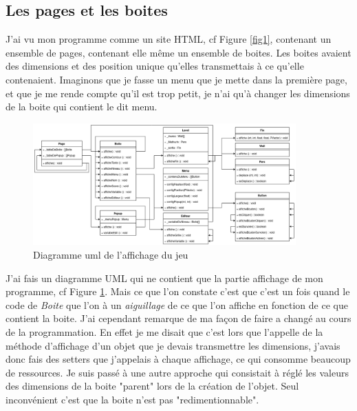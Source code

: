 \documentclass[10pt,a4paper]{article}
\begin{document}
\subsection{Les pages et les boites}
J'ai vu mon programme comme un site HTML, cf Figure \ref{fig1}, contenant un ensemble de pages, contenant elle même un ensemble de boites. Les boites avaient des dimensions et des position unique qu'elles transmettais à ce qu'elle contenaient. Imaginons que je fasse un menu que je mette dans la première page, et que je me rende compte qu'il est trop petit, je n'ai qu'à changer les dimensions de la boite qui contient le dit menu. 
\begin{figure}[h!]
	\centering
	\includegraphics[width=0.9\textwidth]{Affichage .png}
  	\caption{Diagramme uml de l'affichage du jeu}
  	\label{fig4}
\end{figure}
J'ai fais un diagramme UML qui ne contient que la partie affichage de mon programme, cf Figure \ref{fig4}. Mais ce que l'on constate c'est que c'est un fois quand le code de \textit{Boite} que l'on à un \textit{aiguillage} de ce que l'on affiche en fonction de ce que contient la boite. J'ai cependant remarque de ma façon de faire a changé au cours de la programmation. En effet je me disait que c'est lors que l'appelle de la méthode d'affichage d'un objet que je devais transmettre les dimensions, j'avais donc fais des setters que j'appelais à chaque affichage, ce qui consomme beaucoup de ressources. Je suis passé à une autre approche qui consistait à réglé les valeurs des dimensions de la boite "parent" lors de la création de l'objet. Seul inconvénient c'est que la boite n'est pas "redimentionnable". 
\end{document}

